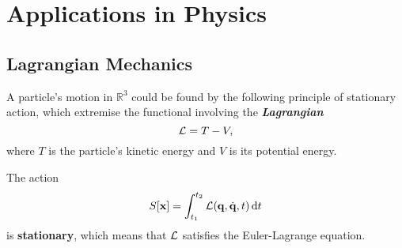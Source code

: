 \documentclass{article}
\theoremstyle{nonumberplain}
\begin{document}
\section{Applications in Physics}
\subsection{Lagrangian Mechanics}
A particle's motion in $\mathbb{R}^3$ could be found by the following principle of stationary action, which extremise the functional involving the \textit{\textbf{Lagrangian}}  
\[
    \mathcal{\MakeUppercase{l}} = T - V,
\]
where $T$ is the particle's kinetic energy and $V$ is its potential energy. 
\begin{frm-thm}
    The action 
    \[
        S[\mathbf{x} ] = \int_{t_1}^{t_2} \mathcal{\MakeUppercase{L}} (\mathbf{q} , \dot{\mathbf{q} }, t) \,\mathrm{d}t
    \]
    is \textbf{stationary}, which means that $\mathcal{\MakeUppercase{L}}$ satisfies the Euler-Lagrange equation. 
\end{frm-thm}
\end{document}
